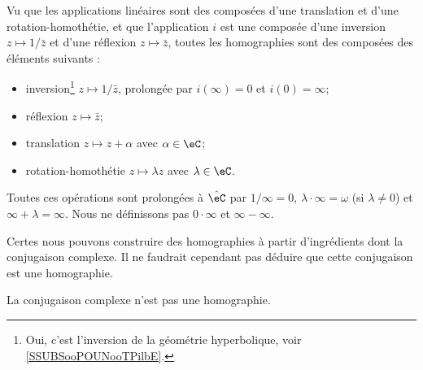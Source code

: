 \begin{normaltext}      \label{NORMooMMKOooQlzjqJ}
    Vu que les applications linéaires sont des composées d'une translation et d'une rotation-homothétie, et que l'application \( i\) est une composée d'une inversion \( z\mapsto 1/\bar z\) et d'une réflexion \( z\mapsto \bar z\), toutes les homographies sont des composées des éléments suivants :
    \begin{itemize}
        \item inversion\footnote{Oui, c'est l'inversion de la géométrie hyperbolique, voir \ref{SSUBSooPOUNooTPilbE}.} \( z\mapsto 1/\bar z\), prolongée par \( i(\infty)=0\) et \( i(0)=\infty\);
        \item réflexion \( z\mapsto \bar z\);
        \item translation \( z\mapsto z+\alpha\) avec \( \alpha\in \eC\);
        \item rotation-homothétie \( z\mapsto \lambda z\) avec \( \lambda\in \eC\).
    \end{itemize}
    
    Toutes ces opérations sont prolongées à \( \hat\eC\) par \( 1/\infty=0\), \( \lambda\cdot \infty=\omega\) (si \( \lambda\neq 0\)) et \( \infty+\lambda=\infty\). Nous ne définissons pas \( 0\cdot \infty\) et \( \infty-\infty\).
\end{normaltext}

Certes nous pouvons construire des homographies à partir d'ingrédients dont la conjugaison complexe. Il ne faudrait cependant pas déduire que cette conjugaison est une homographie.

\begin{lemma}       \label{LEMooGDDJooBpJlUf}
    La conjugaison complexe n'est pas une homographie.
\end{lemma}

